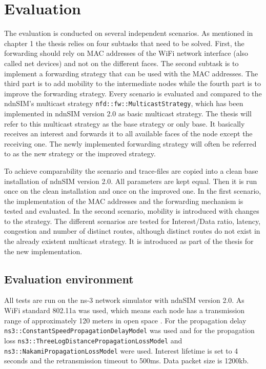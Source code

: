 \chapter{Evaluation}

The evaluation is conducted on several independent scenarios. As mentioned in chapter 1 the thesis relies on four subtasks that need to be solved. First, the forwarding should rely on MAC addresses of the WiFi network interface (also called net devices) and not on the different faces. The second subtask is to implement a forwarding strategy that can be used with the MAC addresses. The third part is to add mobility to the intermediate nodes while the fourth part is to improve the forwarding strategy. Every scenario is evaluated and compared to the ndnSIM's multicast strategy \texttt{nfd::fw::MulticastStrategy}, which has been implemented in ndnSIM version 2.0 as basic multicast strategy. The thesis will refer to this multicast strategy as the base strategy or only base. It basically receives an interest and forwards it to all available faces of the node except the receiving one. The newly implemented forwarding strategy will often be referred to as the new strategy or the improved strategy.

To achieve comparability the scenario and trace-files are copied into a clean base installation of ndnSIM version 2.0. All parameters are kept equal. Then it is run once on the clean installation and once on the improved one. In the first scenario, the implementation of the MAC addresses and the forwarding mechanism is tested and evaluated. In the second scenario, mobility is introduced with changes to the strategy. The different scenarios are tested for Interest/Data ratio, latency, congestion and number of distinct routes, although distinct routes do not exist in the already existent multicast strategy. It is introduced as part of the thesis for the new implementation.

\section{Evaluation environment}

All tests are run on the ns-3 network simulator with ndnSIM version 2.0.  As WiFi standard 802.11a was used, which means each node has a transmission range of approximately 120 meters in open space \cite{wifi80211a} . For the propagation delay \texttt{ns3::Constant}\texttt{SpeedPropagation}\texttt{DelayModel} was used and for the propagation loss \texttt{ns3::Three}\texttt{LogDistance}\texttt{Propagation}\texttt{LossModel} and \texttt{ns3::}\texttt{Nakami}\texttt{Propagation}\texttt{LossModel} were used. Interest lifetime is set to 4 seconds and the retransmission timeout to 500ms. Data packet size is 1200kb.

